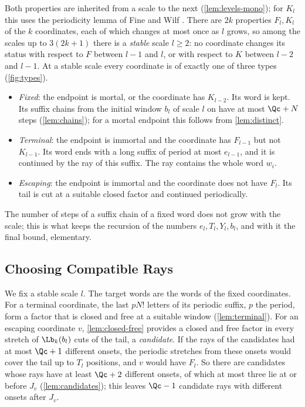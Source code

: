 Both properties are inherited from a scale to the next
(\cref{lem:levels-mono}); for $K_l$ this uses the periodicity lemma of Fine
and Wilf \cite{FineWilf65}. There are $2k$ properties $F_l,K_l$ of the $k$
coordinates, each of which changes at most once as $l$ grows, so among the
scales up to $3(2k+1)$ there is a \emph{stable} scale $l\ge2$: no coordinate
changes its status with respect to $F$ between $l-1$ and $l$, or with
respect to $K$ between $l-2$ and $l-1$. At a stable scale every coordinate
is of exactly one of three types (\cref{fig:types}).
\begin{itemize}
\item \emph{Fixed}: the endpoint is mortal, or the coordinate has $K_{l-2}$.
  Its word is kept. Its suffix chains from the initial window $b_l$ of
  scale $l$ on have at most $\Qc+N$ steps (\cref{lem:chains}); for a mortal
  endpoint this follows from \cref{lem:distinct}.
\item \emph{Terminal}: the endpoint is immortal and the coordinate has
  $F_{l-1}$ but not $K_{l-1}$. Its word ends with a long suffix of period at
  most $e_{l-1}$, and it is continued by the ray of this suffix. The ray
  contains the whole word $w_i$.
\item \emph{Escaping}: the endpoint is immortal and the coordinate does not
  have $F_l$. Its tail is cut at a suitable closed factor and continued
  periodically.
\end{itemize}
The number of steps of a suffix chain of a fixed word does not grow with the
scale; this is what keeps the recursion of the numbers $e_l,T_l,Y_l,b_l$,
and with it the final bound, elementary.

\subsection{Choosing Compatible Rays}\label{sec:tails-choice}

We fix a stable scale $l$. The target words are the words of the fixed
coordinates. For a terminal
coordinate, the last $pN!$ letters of its periodic suffix, $p$ the period,
form a factor that is closed and free at a suitable window
(\cref{lem:terminal}). For an escaping coordinate $v$, \cref{lem:closed-free}
provides a closed and free factor in every stretch of $\Lb_k(b_l)$ cuts of
the tail, a \emph{candidate}. If the rays of the candidates had at most $\Qc+1$ different
onsets, the periodic stretches from these onsets would cover the tail up to
$T_l$ positions, and $v$ would have $F_l$. So there are candidates whose
rays have at least $\Qc+2$ different onsets, of which at most three lie at
or before $J_v$ (\cref{lem:candidates}); this leaves $\Qc-1$ candidate rays
with different onsets after $J_v$.

